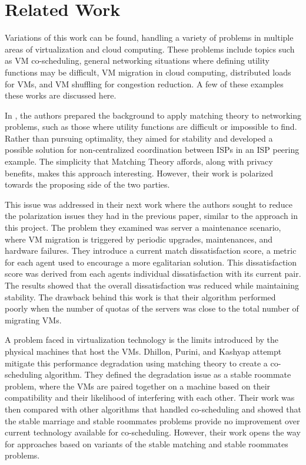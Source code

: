 \documentclass[conference]{IEEEtran}
\begin{document}
\section{Related Work}
\label{sec:related}
Variations of this work can be found, 
handling a variety of problems in multiple areas of virtualization and cloud computing.  
These problems include topics such as VM co-scheduling, general networking situations where defining utility functions may be difficult, 
VM migration in cloud computing, distributed loads for VMs, and VM shuffling for congestion reduction.  
A few of these examples these works are discussed here.

In \cite{xu_seen_2011}, the authors prepared the background to apply matching theory to networking problems, such as those where utility functions are difficult or impossible to find.
Rather than pursuing optimality, they aimed for stability and developed a possible solution for non-centralized coordination between ISPs in an ISP peering example.  The simplicity that Matching Theory affords, along with privacy benefits, makes this approach interesting.  However, their work is polarized towards the proposing side of the two parties.  

This issue was addressed in their next work \cite{xu_egalitarian_2011} where the authors sought to reduce the polarization issues they had in the previous paper, similar to the approach in this project.  
The problem they examined was server a maintenance scenario, where VM migration is triggered by periodic upgrades, maintenances, and hardware failures.  
They introduce a current match dissatisfaction score, a metric for each agent used to encourage a more egalitarian solution.  
This dissatisfaction score was derived from each agents individual dissatisfaction with its current pair.  
The results showed that the overall dissatisfaction was reduced while maintaining stability.  
The drawback behind this work is that their algorithm performed poorly when the number of quotas of the servers was close to the total number of migrating VMs.

A problem faced in virtualization technology is the limits introduced by the physical machines that host the VMs.  
Dhillon, Purini, and Kashyap \cite{dhillon_virtual_2013} attempt mitigate this performance degradation using matching theory to create a co-scheduling algorithm.  
They defined the degradation issue as a stable roommate problem, 
where the VMs are paired together on a machine based on their compatibility and their likelihood of interfering with each other.  
Their work was then compared with other algorithms that handled co-scheduling and showed that the stable marriage and stable roommates problems provide no improvement over current technology available for co-scheduling.  
However, their work opens the way for approaches based on variants of the stable matching and stable roommates problems.
\end{document}
